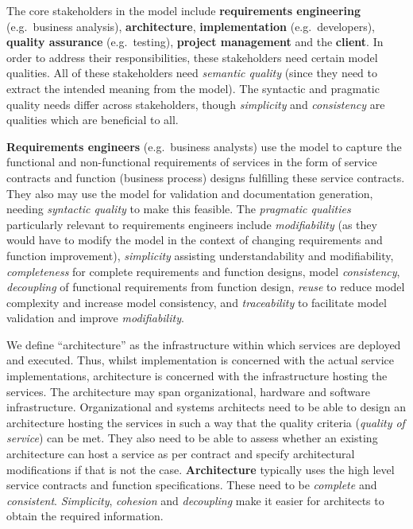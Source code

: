 The core stakeholders in the model include {\bf requirements engineering} (e.g.\ business analysis), {\bf architecture}, {\bf implementation} (e.g.\ developers), {\bf quality assurance} (e.g.\ testing), {\bf project management} and the {\bf client}. In order to address their responsibilities, these stakeholders need certain model qualities. All of these stakeholders need \emph{semantic quality} (since they need to extract the intended meaning from the model). The syntactic and pragmatic quality needs differ across stakeholders, though \emph{simplicity} and \emph{consistency} are qualities which are beneficial to all.

{\bf Requirements engineers} (e.g.\ business analysts) use the model to capture the functional and non-functional requirements of services in the form of service contracts and function (business process) designs fulfilling these service contracts. They also may use the model for validation and documentation generation, needing \emph{syntactic quality} to make this feasible.  The \emph{pragmatic qualities} particularly relevant to requirements engineers include \emph{modifiability} (as they would have to modify the model in the context of changing requirements and function improvement), \emph{simplicity} assisting understandability and modifiability, \emph{completeness} for complete requirements and function designs, model \emph{consistency}, \emph{decoupling} of functional requirements from function design, \emph{reuse} to reduce model complexity and increase model consistency, and \emph{traceability} to facilitate model validation and improve \emph{modifiability}. 

We define ``architecture'' as the infrastructure within which services are deployed and executed. Thus, whilst implementation is concerned with the actual service implementations, architecture is concerned with the infrastructure hosting the services. The architecture may span organizational, hardware and software infrastructure. Organizational and systems architects need to be able to design an architecture hosting the services in such a way that the quality criteria (\emph{quality of service}) can be met. They also need to be able to assess whether an existing architecture can host a service as per contract and specify architectural modifications if that is not the case. {\bf Architecture} typically uses the high level service contracts and function specifications. These need to be \emph{complete} and \emph{consistent}. \emph{Simplicity}, \emph{cohesion} and \emph{decoupling} make it easier for architects to obtain the required information.

